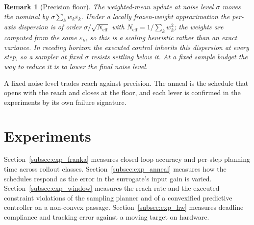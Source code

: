 \documentclass[letterpaper,10pt,conference]{ieeeconf}
\newtheorem{remark}{Remark}
\begin{document}
\begin{remark}[Precision floor]\label{rem:floor}
The weighted-mean update at noise level $\sigma$ moves the nominal by $\sigma \sum_k w_k \varepsilon_k$.
Under a locally frozen-weight approximation the per-axis dispersion is of order $\sigma / \sqrt{N_{\mathrm{eff}}}$ with $N_{\mathrm{eff}} = 1 / \sum_k w_k^{2}$; the weights are computed from the same $\varepsilon_k$, so this is a scaling heuristic rather than an exact variance.
In receding horizon the executed control inherits this dispersion at every step, so a sampler at fixed $\sigma$ resists settling below it.
At a fixed sample budget the way to reduce it is to lower the final noise level.
\end{remark}

A fixed noise level trades reach against precision.
The anneal is the schedule that opens with the reach and closes at the floor, and each lever is confirmed in the experiments by its own failure signature.

\section{Experiments}\label{sec:exp}
Section~\ref{subsec:exp_franka} measures closed-loop accuracy and per-step planning time across rollout classes.
Section~\ref{subsec:exp_anneal} measures how the schedules respond as the error in the surrogate's input gain is varied.
Section~\ref{subsec:exp_window} measures the reach rate and the executed constraint violations of the sampling planner and of a convexified predictive controller on a non-convex passage.
Section~\ref{subsec:exp_hw} measures deadline compliance and tracking error against a moving target on hardware.
\end{document}
